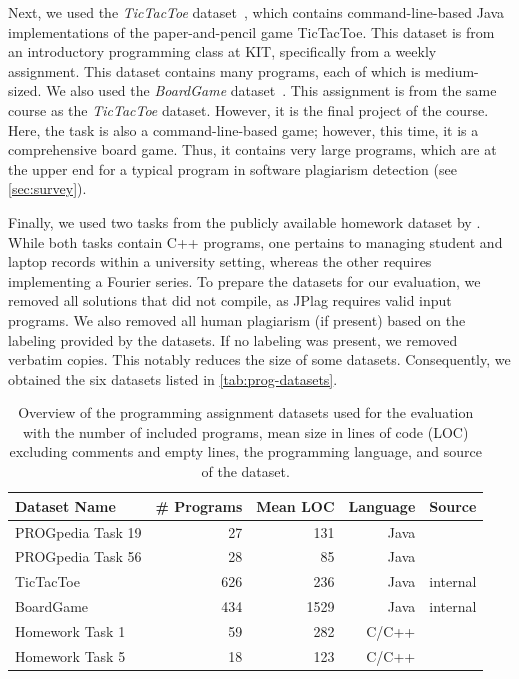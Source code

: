 Next, we used the \textit{TicTacToe} dataset~\cite{Saglam2024b}, which contains command-line-based Java implementations of the paper-and-pencil game TicTacToe. 
This dataset is from an introductory programming class at KIT, specifically from a weekly assignment.
This dataset contains many programs, each of which is medium-sized.
We also used the \textit{BoardGame} dataset~\cite{Saglam2024b}. This assignment is from the same course as the \textit{TicTacToe} dataset. However, it is the final project of the course. Here, the task is also a command-line-based game; however, this time, it is a comprehensive board game. Thus, it contains very large programs, which are at the upper end for a typical program in software plagiarism detection (see \autoref{sec:survey}).

Finally, we used two tasks from the publicly available homework dataset by \citet{Ljubovic2020a}.
While both tasks contain C++ programs, one pertains to managing student and laptop records within a university setting, whereas the other requires implementing a Fourier series.
To prepare the datasets for our evaluation, we removed all solutions that did not compile, as JPlag requires valid input programs.
We also removed all human plagiarism (if present) based on the labeling provided by the datasets. If no labeling was present, we removed verbatim copies.
This notably reduces the size of some datasets.
Consequently, we obtained the six datasets listed in \autoref{tab:prog-datasets}.

\begin{table}[b]
    \centering
    \begin{tabular}{lrrrr}
        \toprule
        {Dataset Name} & {\# Programs} & {Mean LOC} & Language & Source \\
        \midrule
        PROGpedia Task 19 & 27 & 131 & Java & \cite{paiva2023}\\
        PROGpedia Task 56 & 28 & 85 & Java & \cite{paiva2023}\\
        TicTacToe & 626 & 236 & Java & \scriptsize{internal}\\
        BoardGame & 434 & 1529 & Java & \scriptsize{internal}\\
        Homework Task 1 & 59 & 282 & C/C++ & \cite{Ljubovic2020a}\\
        Homework Task 5 & 18 & 123 & C/C++ & \cite{Ljubovic2020a}\\
        \bottomrule
    \end{tabular}
    \caption[Evaluation Datasets]{Overview of the programming assignment datasets used for the evaluation with the number of included programs, mean size in lines of code (LOC) excluding comments and empty lines, the programming language, and source of the dataset.}
    \label{tab:prog-datasets}
\end{table}

